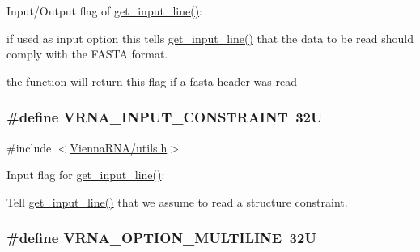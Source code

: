 Input/\-Output flag of \hyperlink{group__utils_ga8ef1835eb83f542396f59f0b205965e5}{get\-\_\-input\-\_\-line()}\-:\par
if used as input option this tells \hyperlink{group__utils_ga8ef1835eb83f542396f59f0b205965e5}{get\-\_\-input\-\_\-line()} that the data to be read should comply with the F\-A\-S\-T\-A format. 

the function will return this flag if a fasta header was read \hypertarget{group__utils_gac08a9df45b9721b97a47dbfe7a6e5f85}{
\subsubsection[{V\-R\-N\-A\-\_\-\-I\-N\-P\-U\-T\-\_\-\-C\-O\-N\-S\-T\-R\-A\-I\-N\-T}]{\setlength{\rightskip}{0pt plus 5cm}\#define V\-R\-N\-A\-\_\-\-I\-N\-P\-U\-T\-\_\-\-C\-O\-N\-S\-T\-R\-A\-I\-N\-T~32\-U}}\label{group__utils_gac08a9df45b9721b97a47dbfe7a6e5f85}


{\ttfamily \#include $<$\hyperlink{utils_8h}{Vienna\-R\-N\-A/utils.\-h}$>$}



Input flag for \hyperlink{group__utils_ga8ef1835eb83f542396f59f0b205965e5}{get\-\_\-input\-\_\-line()}\-:\par
Tell \hyperlink{group__utils_ga8ef1835eb83f542396f59f0b205965e5}{get\-\_\-input\-\_\-line()} that we assume to read a structure constraint. 

\hypertarget{group__utils_gabec89c09874528c6cb73140a4c3d86d7}{
\subsubsection[{V\-R\-N\-A\-\_\-\-O\-P\-T\-I\-O\-N\-\_\-\-M\-U\-L\-T\-I\-L\-I\-N\-E}]{\setlength{\rightskip}{0pt plus 5cm}\#define V\-R\-N\-A\-\_\-\-O\-P\-T\-I\-O\-N\-\_\-\-M\-U\-L\-T\-I\-L\-I\-N\-E~32\-U}}\label{group__utils_gabec89c09874528c6cb73140a4c3d86d7}


